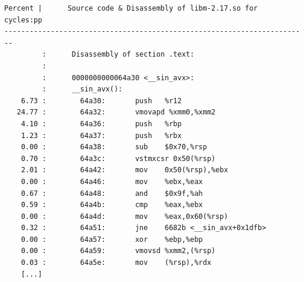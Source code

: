 \documentclass[a4paper]{jpconf}
\begin{document}
\begin{appendices}
\begin{minipage}{\linewidth}
\begin{lstlisting}[language={[x64]Assembler},basicstyle=\ttfamily\tiny, 
caption=\_\_sin\_avx cycles annotation]
Percent |      Source code & Disassembly of libm-2.17.so for  cycles:pp
------------------------------------------------------------------------
         :      Disassembly of section .text:
         :
         :      0000000000064a30 <__sin_avx>:
         :      __sin_avx():
    6.73 :        64a30:       push   %r12
   24.77 :        64a32:       vmovapd %xmm0,%xmm2
    4.10 :        64a36:       push   %rbp
    1.23 :        64a37:       push   %rbx
    0.00 :        64a38:       sub    $0x70,%rsp
    0.70 :        64a3c:       vstmxcsr 0x50(%rsp)
    2.01 :        64a42:       mov    0x50(%rsp),%ebx
    0.00 :        64a46:       mov    %ebx,%eax
    0.67 :        64a48:       and    $0x9f,%ah
    0.59 :        64a4b:       cmp    %eax,%ebx
    0.00 :        64a4d:       mov    %eax,0x60(%rsp)
    0.32 :        64a51:       jne    6682b <__sin_avx+0x1dfb>
    0.00 :        64a57:       xor    %ebp,%ebp
    0.00 :        64a59:       vmovsd %xmm2,(%rsp)
    0.03 :        64a5e:       mov    (%rsp),%rdx
    [...]
\end{lstlisting}
\end{minipage}


\end{appendices}
\end{document}
